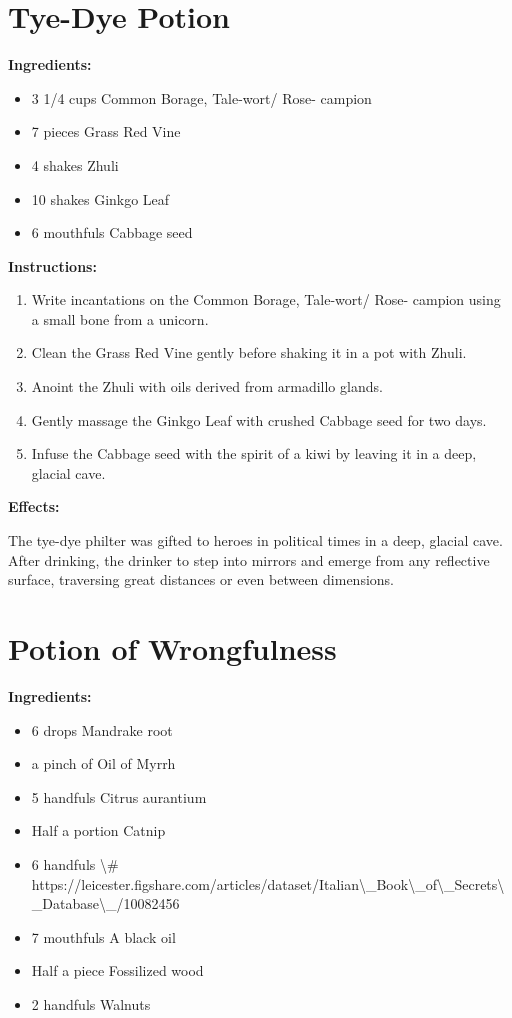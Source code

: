 \documentclass{article}
\begin{document}
\newpage
\section*{Tye-Dye Potion}

\textbf{Ingredients:}

\begin{itemize}
  \item 3 1/4 cups Common Borage, Tale-wort/ Rose- campion
  \item 7 pieces Grass Red Vine
  \item 4 shakes Zhuli
  \item 10 shakes Ginkgo Leaf
  \item 6 mouthfuls Cabbage seed
\end{itemize}

\textbf{Instructions:}

\begin{enumerate}
  \item Write incantations on the Common Borage, Tale-wort/ Rose- campion using a small bone from a unicorn.
  \item Clean the Grass Red Vine gently before shaking it in a pot with Zhuli.
  \item Anoint the Zhuli with oils derived from armadillo glands.
  \item Gently massage the Ginkgo Leaf with crushed Cabbage seed for two days.
  \item Infuse the Cabbage seed with the spirit of a kiwi by leaving it in a deep, glacial cave.
\end{enumerate}

\textbf{Effects:}

The tye-dye philter was gifted to heroes in political times in a deep, glacial cave. After drinking, the drinker to step into mirrors and emerge from any reflective surface, traversing great distances or even between dimensions.

\newpage
\section*{Potion of Wrongfulness}

\textbf{Ingredients:}

\begin{itemize}
  \item 6 drops Mandrake root
  \item a pinch of Oil of Myrrh
  \item 5 handfuls Citrus aurantium
  \item Half a portion Catnip
  \item 6 handfuls \textbackslash{}# https://leicester.figshare.com/articles/dataset/Italian\textbackslash{}_Book\textbackslash{}_of\textbackslash{}_Secrets\textbackslash{}_Database\textbackslash{}_/10082456
  \item 7 mouthfuls A black oil
  \item Half a piece Fossilized wood
  \item 2 handfuls Walnuts
\end{itemize}
\end{document}

